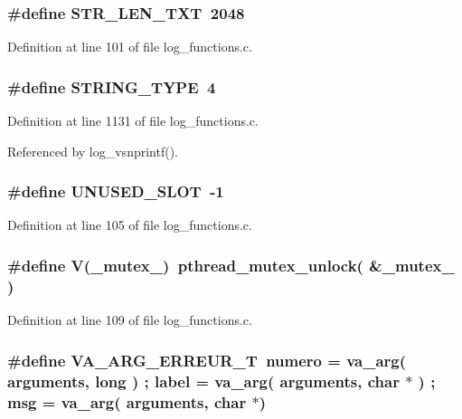 \subsubsection{\setlength{\rightskip}{0pt plus 5cm}\#define STR\_\-LEN\_\-TXT\ 2048}\label{log__functions_8c_a0}




Definition at line 101 of file log\_\-functions.c.
\subsubsection{\setlength{\rightskip}{0pt plus 5cm}\#define STRING\_\-TYPE\ 4}\label{log__functions_8c_a13}




Definition at line 1131 of file log\_\-functions.c.

Referenced by log\_\-vsnprintf().
\subsubsection{\setlength{\rightskip}{0pt plus 5cm}\#define UNUSED\_\-SLOT\ -1}\label{log__functions_8c_a4}




Definition at line 105 of file log\_\-functions.c.
\subsubsection{\setlength{\rightskip}{0pt plus 5cm}\#define V(\_\-mutex\_\-)\ pthread\_\-mutex\_\-unlock( \&\_\-mutex\_\- )}\label{log__functions_8c_a6}




Definition at line 109 of file log\_\-functions.c.
\subsubsection{\setlength{\rightskip}{0pt plus 5cm}\#define VA\_\-ARG\_\-ERREUR\_\-T\ numero = va\_\-arg( arguments, long ) ; label  = va\_\-arg( arguments, char $\ast$ ) ; msg    = va\_\-arg( arguments, char $\ast$)}\label{log__functions_8c_a35}





